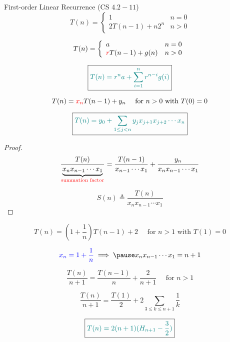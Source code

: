 \begin{frame}{}
  \begin{exampleblock}{First-order Linear Recurrence (CS $4.2-11$)}
    \[
      T(n) = \left\{\begin{array}{lr}
	1		& n = 0 \\
	2T(n-1) + n 2^n & n > 0 
      \end{array}\right.
    \]
  \end{exampleblock}

  \pause
  \vspace{0.50cm}
  \begin{theorem}
    \[
      T(n) = \left\{\begin{array}{lr}
	a		& n = 0 \\
	\textcolor{red}{r}T(n-1) + g(n) & n > 0 
      \end{array}\right.
    \]

    \pause
    \vspace{0.30cm}
    \[
      \boxed{\textcolor{teal}{T(n) = r^n a + \sum_{i=1}^{n} r^{n-i} g(i)}}
    \]
  \end{theorem}
\end{frame}

\begin{frame}{}
  \begin{theorem}
    \[
      T(n) = \textcolor{red}{x_n} T(n-1) + y_n  \quad \text{ for } n > 0 \text{ with } T(0) = 0
    \]

    \[
      \boxed{\textcolor{teal}{T(n) = y_0 + \sum_{1 \le j < n} y_j x_{j+1} x_{j+2} \cdots x_n}}
    \]
  \end{theorem}

  \pause
  \begin{proof}
    \[
      \frac{T(n)}{\underbrace{x_n x_{n-1} \cdots x_1}_{\text{\textcolor{red}{summation factor}}}}
      	= \frac{T(n-1)}{x_{n-1} \cdots x_1} + \frac{y_n}{x_n x_{n-1} \cdots x_1}
    \]

    \pause
    \[
      S(n) \triangleq \frac{T(n)}{x_n x_{n-1} \cdots x_1}
    \]
  \end{proof}
\end{frame}

\begin{frame}{}
  \[
    T(n) = (1 + \frac{1}{n}) T(n-1) + 2  \quad \text{ for } n > 1 \text{ with } T(1) = 0
  \]

  \pause
  \[
    \blue{x_n = 1 + \frac{1}{n}} \implies \pause x_n x_{n-1} \cdots x_1 = n + 1
  \]

  \pause
  \[
    \frac{T(n)}{n+1} = \frac{T(n-1)}{n} + \frac{2}{n+1} \quad \text{ for } n > 1
  \]

  \pause
  \vspace{0.30cm}
  \[
    \frac{T(n)}{n+1} = \frac{T(1)}{2} + 2 \sum_{3 \le k \le n+1} \frac{1}{k}
  \]

  \pause
  \vspace{0.30cm}
  \[
    \boxed{\textcolor{teal}{T(n) = 2(n+1) (H_{n+1} - \frac{3}{2})}}
  \]
\end{frame}

